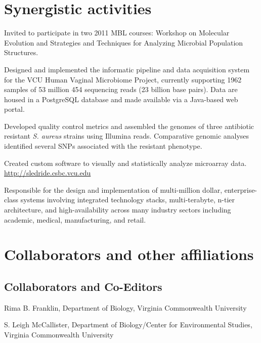 \section{Synergistic activities}
\begin{packed_item}
	\item{Invited to participate in two 2011 MBL courses: Workshop on Molecular Evolution and Strategies 
	and Techniques for Analyzing Microbial Population Structures}.
	\item{Designed and implemented the informatic pipeline and data acquisition system for the VCU Human Vaginal Microbiome 
	Project, currently supporting \num{1962} samples of 53 million 454 sequencing reads (23 billion base pairs).  Data 
	are housed in a PostgreSQL database and made available via a Java-based web portal.}
	\item{Developed quality control metrics and assembled the genomes of three antibiotic resistant \textit{S. aureus} 
	strains using Illumina reads.  Comparative genomic analyses identified several SNPs associated with the resistant phenotype.}
	\item{Created custom software to visually and statistically analyze microarray data.\\
	 \url{http://sledride.csbc.vcu.edu}}
	\item{Responsible for the design and implementation of multi-million dollar, enterprise-class systems involving 
	integrated technology stacks, multi-terabyte, n-tier architecture, and high-availability across many industry 
	sectors including academic, medical, manufacturing, and retail.}
\end{packed_item}

\section{Collaborators and other affiliations}

\subsection*{Collaborators and Co-Editors}
\begin{packed_item}
	\item{Rima B. Franklin, Department of Biology, Virginia Commonwealth University}
	\item{S. Leigh McCallister, Department of Biology/Center for Environmental Studies, 
	Virginia Commonwealth University}		
\end{packed_item}

